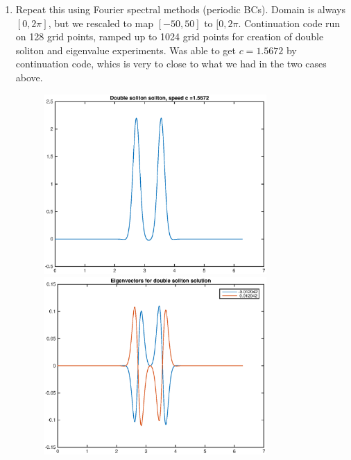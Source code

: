 \documentclass[12pt]{article}
\begin{document}
\begin{enumerate}
	\item Repeat this using Fourier spectral methods (periodic BCs). Domain is always $[0, 2 \pi]$, but we rescaled to map $[-50, 50]$ to $[0, 2 \pi$. Continuation code run on 128 grid points, ramped up to 1024 grid points for creation of double soliton and eigenvalue experiments. Was able to get $c = 1.5672$ by continuation code, whics is very to close to what we had in the two cases above. 

	\begin{figure}[H]
	\includegraphics[width=8.5cm]{double1_Four50.eps}
	\includegraphics[width=8.5cm]{double1_Four50_vec.eps}
	\end{figure}


\end{enumerate}
\end{document}
